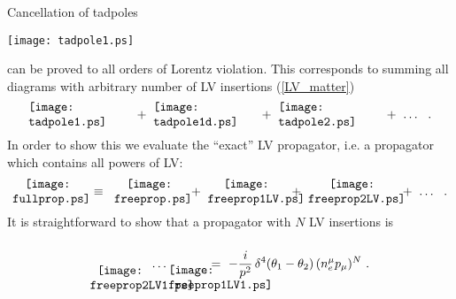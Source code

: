 \documentclass[paper,12pt]{revtex4}
\begin{document}
	Cancellation of tadpoles 
\begin{center}
\texttt{[image: tadpole1.ps]}
\end{center}
	can be proved to all orders of Lorentz violation.
	This corresponds to summing all diagrams with arbitrary
	number of LV insertions (\ref{LV_matter})
\begin{equation}
\label{full_tadpole}
	\begin{minipage}[c]{3.0cm}
	\texttt{[image: tadpole1.ps]} 
	\end{minipage}
	   +~
	\begin{minipage}[c]{3.0cm}
	\texttt{[image: tadpole1d.ps]} 
	\end{minipage}
	   +~
	\begin{minipage}[c]{3.0cm}
	\texttt{[image: tadpole2.ps]} 
	\end{minipage}
	   +~
	   \ldots
	   ~~.
\end{equation}
	In order to show this we evaluate the ``exact'' LV 
	propagator, i.e. a propagator which contains all powers
	of LV:
\begin{equation}
\label{def_full_prop}
\begin{minipage}[c]{2.0cm}
\centering
\texttt{[image: fullprop.ps]} 
\end{minipage}
    \;~\equiv~\;
\begin{minipage}[c]{2.0cm}
\centering
\texttt{[image: freeprop.ps]} 
\end{minipage}
    ~+~
\begin{minipage}[c]{2.2cm}
\centering
\texttt{[image: freeprop1LV.ps]} 
\end{minipage}
    ~+~
\begin{minipage}[c]{2.5cm}
\centering
\texttt{[image: freeprop2LV.ps]} 
\end{minipage}
    ~+~
    \ldots
    ~~.
\end{equation}
	It is straightforward to show that a propagator with $ N $
	LV insertions is
\begin{equation}
\label{N_LV_prop}
	\begin{minipage}[c]{1.7cm}
	\vspace{0.8cm}
	\centering
	\texttt{[image: freeprop2LV1.ps]}
	\end{minipage}
		\ldots
	\begin{minipage}[c]{1.0cm}
	\vspace{0.78cm}
	\centering
	\texttt{[image: freeprop1LV1.ps]} 
	\end{minipage}
	~=~ 
	- \frac{i}{p^2}\, \delta^4(\theta_1 - \theta_2)\,
	    (n_e^\mu p_\mu)^N  
	~.
\end{equation}
\end{document}
